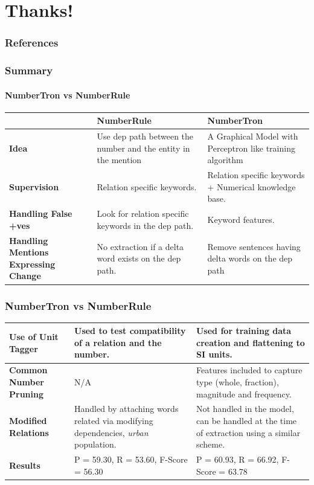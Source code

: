 \documentclass{beamer}
\begin{document}
\section{Thanks!}
\begin{frame}[allowframebreaks]
        \frametitle{References}
        
        
\end{frame}

\begin{frame}
\frametitle{Summary}
\framesubtitle{NumberTron vs NumberRule}
\begin{tabularx}{\textwidth}{|b |b |b |}
\hline
  & \textbf{NumberRule} &  \textbf{NumberTron}\\ \hline
 \textbf{Idea} & Use dep path between the number and the entity in the mention& A Graphical Model with Perceptron like training algorithm\\ \hline
 \textbf{Supervision}& Relation specific keywords. & Relation specific keywords + Numerical knowledge base. \\ \hline
 \textbf{Handling False +ves}&  Look for relation specific keywords in the dep path.&  Keyword features. \\ \hline
\textbf{Handling Mentions Expressing Change}& No extraction if a delta word exists on the dep path. &  Remove sentences having delta words on the dep path\\ \hline 

 \end{tabularx}
\end{frame}

\begin{frame}
\frametitle{NumberTron vs NumberRule}
\begin{tabularx}{\textwidth}{|b |b |b |}
\hline
\textbf{Use of Unit Tagger} & Used to test compatibility of a relation and the number.& Used for training data creation and flattening to SI units.\\ \hline
 \textbf{Common Number Pruning} & N/A & Features included to capture type (whole, fraction), magnitude and frequency. \\ \hline
 \textbf{Modified Relations} & Handled by attaching words related via modifying dependencies, \emph{urban} population.& Not handled in the model, can be handled at the time of extraction using a similar scheme. \\ \hline
  \textbf{Results} & P = 59.30, R = 53.60, F-Score = 56.30& P = 60.93, R = 66.92, F-Score = 63.78\\ \hline
\end{tabularx}
\end{frame}
\end{document}
